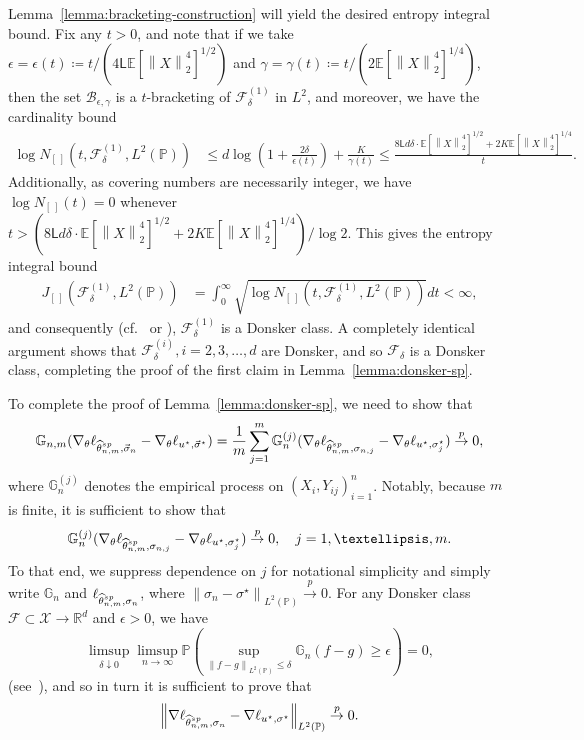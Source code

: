 \documentclass[11pt]{article}
\newcommand{\Ep}{\mathbb{E}}
\newcommand{\E}{\mathbb{E}}
\newcommand{\Prb}{\mathbb{P}}
\newcommand{\R}{\mathbb{R}} %
\renewcommand{\P}{\mathbb{P}}
\newcommand{\mc}[1]{\mathcal{#1}}
\newcommand{\norm}[1]{\left\|{#1}\right\|} %
\newcommand{\what}[1]{\widehat{#1}}
\newcommand{\sem}{^{\textup{sp}}}
\newcommand{\lipconst}{\mathsf{L}}
\newcommand{\loss}{\ell}
\newcommand{\ltwo}[1]{\norm{#1}_2} %
\newcommand{\<}{\langle} %
\renewcommand{\>}{\rangle}
\newcommand{\cp}{\stackrel{p}{\rightarrow}}
\newcommand{\defeq}{\coloneqq}
\newcommand{\LtwoP}[1]{\norm{#1}_{L^2(\Prb)}}
\newcommand{\LtwoPbold}[1]{\norm{#1}_{L^2(\Prb)}}
\newcommand{\opt}{^\star}
\newcommand{\spe}{\what{\theta}\sem_{n,m}} %
\newcommand{\G}{\mathbb{G}}
\begin{document}
Lemma~\ref{lemma:bracketing-construction} will yield the desired entropy
integral bound. Fix any $t > 0$, and note that if we take $\epsilon
=\epsilon(t) \defeq t / (4 \lipconst \E[\ltwo{X}^4]^{1/2})$ and $\gamma =
\gamma(t) \defeq t / (2 \E[\ltwo{X}^4]^{1/4})$, then the set
$\mc{B}_{\epsilon, \gamma}$ is a $t$-bracketing of $\mc{F}_\delta^{(1)}$ in
$L^2$, and moreover, we have the cardinality bound
\begin{align*}
	\log N_{[\,]}(t, \mathcal{F}_{\delta}^{(1)} , L^2(\Prb))
	&
	\leq d \log \left(1 + \frac{2 \delta}{\epsilon(t)}\right)
	+ \frac{K}{\gamma(t)}
	\leq \frac{8\lipconst d \delta \cdot \Ep [\ltwo{X}^4]^{1/2}
		+ 2K \Ep[\ltwo{X}^4]^{1/4}}{t}.
\end{align*}
Additionally, as covering numbers are necessarily integer,
we have $\log N_{[\,]}(t) = 0$
whenever
$t > (8\lipconst d \delta \cdot \Ep [\ltwo{X}^4]^{1/2}
+ 2K \Ep[\ltwo{X}^4]^{1/4}) / \log 2$.
This gives the entropy integral bound
\begin{align*}
	J_{[\, ]}(\mathcal{F}_{\delta}^{(1)}, L^2(\Prb))
	& = \int_0^\infty \sqrt{\log N_{[\,]}(t ,\mathcal{F}_{\delta}^{(1)} ,
		L^2(\Prb))} d t < \infty,
\end{align*}
and consequently (cf.~\cite[Thm.~19.5]{VanDerVaart98} or
\cite[Ch.~2.5.2]{VanDerVaartWe96}), $\mathcal{F}_{\delta}^{(1)}$ is a
Donsker class.  A completely identical argument shows that
$\mathcal{F}_{\delta}^{(i)}, i=2,3,\dots, d$ are Donsker, and so
$\mathcal{F}_\delta$ is a Donsker class, completing the proof of the
first claim in Lemma~\ref{lemma:donsker-sp}.

To complete the proof of Lemma~\ref{lemma:donsker-sp},
we need to show that
\begin{align*}
	\G_{n,m} (\nabla_\theta\loss_{\spe, \vec{\sigma}_n}
	- \nabla_\theta\loss_{u\opt, \vec{\sigma}\opt})
	=
	\frac{1}{m}
	\sum_{j = 1}^m
	\G_n^{(j)} (\nabla_\theta\loss_{\spe, \sigma_{n,j}}
	- \nabla_\theta \loss_{u\opt, \sigma\opt_j})
	\cp 0,
\end{align*}
where $\G_n^{(j)}$ denotes the empirical process on
$(X_i, Y_{ij})_{i=  1}^n$. Notably, because $m$ is finite, it is sufficient
to show that
\begin{equation*}
	\G_n^{(j)} (\nabla_\theta\loss_{\spe, \sigma_{n,j}}
	- \nabla_\theta \loss_{u\opt, \sigma\opt_j})
	\cp 0,
	~~~
	j = 1, \ldots, m.
\end{equation*}
To that end, we suppress dependence on $j$ for notational
simplicity and simply write $\G_n$ and $\loss_{\spe, \sigma_n}$, where
$\LtwoP{\sigma_n - \sigma\opt} \cp 0$.
For any Donsker class $\mc{F} \subset \mc{X} \to \R^d$ and
$\epsilon > 0$,
we have
\begin{equation*}
	\limsup_{\delta \downarrow 0}
	\limsup_{n \to \infty}
	\P\left(\sup_{\LtwoP{f - g} \le \delta}
	\G_n(f - g) \ge \epsilon\right) = 0,
\end{equation*}
(see~\cite[Thm.~3.7.31]{GineNi21}), and so in turn it is sufficient to prove
that
\begin{equation}
	\label{eqn:ltwo-p-convergence-sp}
	\LtwoPbold{\nabla \loss_{\spe, \sigma_n} - \nabla\loss_{u\opt, \sigma\opt}}
	\cp 0.
\end{equation}
\end{document}
